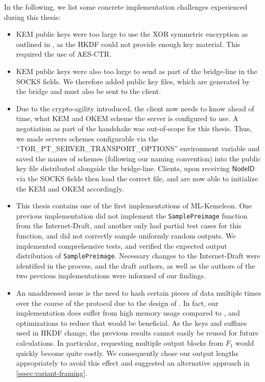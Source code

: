 In the following, we list some concrete implementation challenges experienced during this thesis:
\begin{itemize}
    \item KEM public keys were too large to use the XOR symmetric encryption as outlined in \cite{EPRINT:GRSV25}, as the HKDF could not provide enough key material. This required the use of AES-CTR.

    \item KEM public keys were also too large to send as part of the bridge-line in the SOCKS fields. We therefore added public key files, which are generated by the bridge and must also be sent to the client.

    \item Due to the crypto-agility introduced, the client now needs to know ahead of time, what KEM and OKEM scheme the server is configured to use. A negotiation as part of the handshake was out-of-scope for this thesis. Thus, we made servers schemes configurable via the ``TOR\_PT\_SERVER\_TRANSPORT\_OPTIONS'' environment variable and saved the names of schemes (following our naming convention) into the public key file distributed alongside the bridge-line. Clients, upon receiving $\mathsf{NodeID}$ via the SOCKS fields then load the correct file, and are now able to initialize the KEM and OKEM accordingly.

    \item This thesis contains one of the first implementations of ML-Kemeleon. One previous implementation \cite{ct-kemeleon} did not implement the \texttt{SamplePreimage} function from the Internet-Draft, and another \cite{jmwample-kemeleon} only had partial test cases for this function, and did not correctly sample uniformly random outputs. We implemented comprehensive tests, and verified the expected output distribution of \texttt{SamplePreimage}. Necessary changes to the Internet-Draft were identified in the process, and the draft authors, as well as the authors of the two previous implementations were informed of our findings.

    \item An unaddressed issue is the need to hash certain pieces of data multiple times over the course of the protocol due to the design of \drivel{}. In fact, our implementation does suffer from high memory usage compared to \obfsfour{}, and optimizations to reduce that would be beneficial. As the keys and suffixes used in HKDF change, the previous results cannot easily be reused for future calculations. In particular, requesting multiple output blocks from $F_1$ would quickly become quite costly. We consequently chose our output lengths appropriately to avoid this effect and suggested an alternative approach in \cref{sssec:variant-framing}.
\end{itemize}

